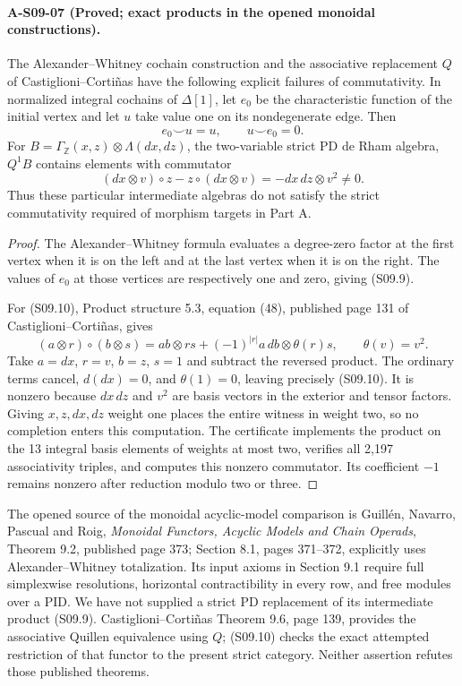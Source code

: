 \paragraph{A-S09-07 (Proved; exact products in the opened monoidal constructions).}
The Alexander--Whitney cochain construction and the associative
replacement $Q$ of Castiglioni--Corti\~nas have the following explicit
failures of commutativity.  In normalized integral cochains of
$\Delta[1]$, let $e_0$ be the characteristic function of the initial
vertex and let $u$ take value one on its nondegenerate edge.  Then
\[
 e_0\smile u=u,\qquad u\smile e_0=0.
 \tag{S09.9}
\]
For $B=\Gamma_{\mathbb Z}(x,z)\otimes\Lambda(dx,dz)$, the
two-variable strict PD de Rham algebra, $Q^1B$ contains elements
with commutator
\[
 (dx\otimes v)\circ z-z\circ(dx\otimes v)
 =-dx\,dz\otimes v^2\ne0.
 \tag{S09.10}
\]
Thus these particular intermediate algebras do not satisfy the
strict commutativity required of morphism targets in Part A.

\begin{proof}
The Alexander--Whitney formula evaluates a degree-zero factor at
the first vertex when it is on the left and at the last vertex
when it is on the right.  The values of $e_0$ at those vertices
are respectively one and zero, giving (S09.9).

For (S09.10), Product structure 5.3, equation (48), published
page 131 of Castiglioni--Corti\~nas, gives
\[
 (a\otimes r)\circ(b\otimes s)
 =ab\otimes rs+(-1)^{|r|}a\,db\otimes\theta(r)s,
 \qquad\theta(v)=v^2.
\]
Take $a=dx$, $r=v$, $b=z$, $s=1$ and subtract the reversed
product.  The ordinary terms cancel, $d(dx)=0$, and
$\theta(1)=0$, leaving precisely (S09.10).  It is nonzero because
$dx\,dz$ and $v^2$ are basis vectors in the exterior and tensor
factors.  Giving $x,z,dx,dz$ weight one places the entire witness
in weight two, so no completion enters this computation.  The
certificate implements the product on the 13 integral basis
elements of weights at most two, verifies all 2,197 associativity
triples, and computes this nonzero commutator.  Its coefficient
$-1$ remains nonzero after reduction modulo two or three.
\end{proof}

The opened source of the monoidal acyclic-model comparison is
Guill\'en, Navarro, Pascual and Roig, \emph{Monoidal Functors, Acyclic
Models and Chain Operads}, Theorem 9.2, published page 373;
Section 8.1, pages 371--372, explicitly uses Alexander--Whitney
totalization.  Its input axioms in Section 9.1 require full
simplexwise resolutions, horizontal contractibility in every row,
and free modules over a PID.  We have not supplied a strict PD
replacement of its intermediate product (S09.9).  Castiglioni--Corti\~nas
Theorem 9.6, page 139, provides the associative Quillen equivalence
using $Q$; (S09.10) checks the exact attempted restriction of that
functor to the present strict category.  Neither assertion refutes
those published theorems.

